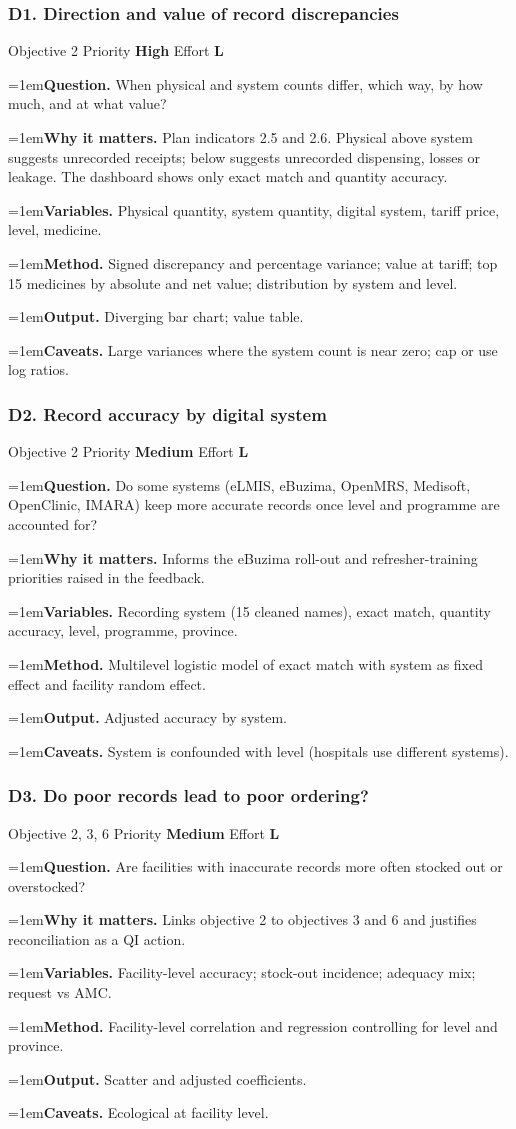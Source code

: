 \documentclass[10pt,a4paper]{article}
\newcommand{\field}[2]{\par\hangindent=1em\textbf{#1.} #2}
\begin{document}
\subsubsection*{D1. Direction and value of record discrepancies}
{\footnotesize\color{gray} Objective 2 \textperiodcentered{} Priority \textbf{High} \textperiodcentered{} Effort \textbf{L}}
\field{Question}{When physical and system counts differ, which way, by how much, and at what value?}
\field{Why it matters}{Plan indicators 2.5 and 2.6. Physical above system suggests unrecorded receipts; below suggests unrecorded dispensing, losses or leakage. The dashboard shows only exact match and quantity accuracy.}
\field{Variables}{Physical quantity, system quantity, digital system, tariff price, level, medicine.}
\field{Method}{Signed discrepancy and percentage variance; value at tariff; top 15 medicines by absolute and net value; distribution by system and level.}
\field{Output}{Diverging bar chart; value table.}
\field{Caveats}{Large variances where the system count is near zero; cap or use log ratios.}
\subsubsection*{D2. Record accuracy by digital system}
{\footnotesize\color{gray} Objective 2 \textperiodcentered{} Priority \textbf{Medium} \textperiodcentered{} Effort \textbf{L}}
\field{Question}{Do some systems (eLMIS, eBuzima, OpenMRS, Medisoft, OpenClinic, IMARA) keep more accurate records once level and programme are accounted for?}
\field{Why it matters}{Informs the eBuzima roll-out and refresher-training priorities raised in the feedback.}
\field{Variables}{Recording system (15 cleaned names), exact match, quantity accuracy, level, programme, province.}
\field{Method}{Multilevel logistic model of exact match with system as fixed effect and facility random effect.}
\field{Output}{Adjusted accuracy by system.}
\field{Caveats}{System is confounded with level (hospitals use different systems).}
\subsubsection*{D3. Do poor records lead to poor ordering?}
{\footnotesize\color{gray} Objective 2, 3, 6 \textperiodcentered{} Priority \textbf{Medium} \textperiodcentered{} Effort \textbf{L}}
\field{Question}{Are facilities with inaccurate records more often stocked out or overstocked?}
\field{Why it matters}{Links objective 2 to objectives 3 and 6 and justifies reconciliation as a QI action.}
\field{Variables}{Facility-level accuracy; stock-out incidence; adequacy mix; request vs AMC.}
\field{Method}{Facility-level correlation and regression controlling for level and province.}
\field{Output}{Scatter and adjusted coefficients.}
\field{Caveats}{Ecological at facility level.}
\end{document}
